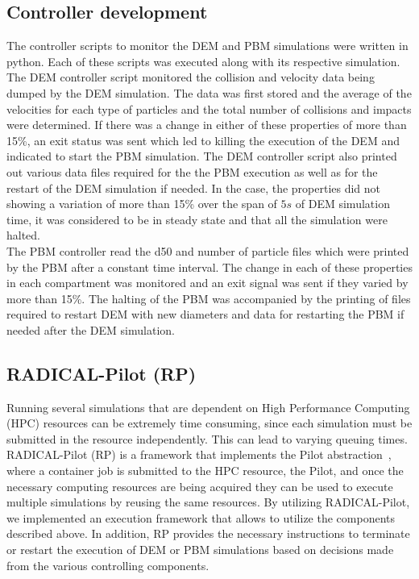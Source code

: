 \documentclass[fleqn,twoside,10pt]{article}
\begin{document}
\subsection{Controller development}
The controller scripts to monitor the DEM and PBM simulations were written in python. Each of these 
scripts was executed along with its respective simulation. The DEM controller script monitored the 
collision and velocity data being dumped by the DEM simulation. The data was first stored and the 
average of the velocities for each type of particles and the total number of collisions and impacts 
were determined. If there was a change in either of these properties of more 
than 15\%, an exit 
status was sent which led to killing the execution of the DEM and indicated to start the PBM 
simulation. The DEM controller script also printed out various data files required for the the PBM 
execution as well as for the restart of the DEM simulation if needed. In the case, the properties did  
not showing a variation of more than 15\% over the span of $5s$ of DEM simulation time, it was 
considered to be in steady state and that all the simulation were halted.\\
The PBM controller read the d50 and number of particle files which were printed by the PBM after a 
constant time interval. The change in each of these properties in each compartment was monitored 
and an exit signal was sent if they varied by more than 15\%. The halting of the PBM was accompanied 
by the printing of files required to restart DEM with new diameters and data for restarting the PBM 
if needed after the DEM simulation.  

\subsection{RADICAL-Pilot (RP)}
Running several simulations that are dependent on High Performance Computing (HPC) resources can 
be extremely time consuming, since each simulation must be submitted in the resource independently.
This can lead to varying queuing times. RADICAL-Pilot (RP) is a framework that implements the Pilot 
abstraction~\cite{pstar12}, where a container job is submitted to the HPC 
resource, the Pilot,
and once the necessary computing resources are being acquired they can be used to execute multiple
simulations by reusing the same resources. By utilizing RADICAL-Pilot, we implemented an execution
framework that allows to utilize the components described above. In addition, RP provides the necessary
instructions to terminate or restart the execution of DEM or PBM simulations based on decisions
made from the various controlling components.
\end{document}
